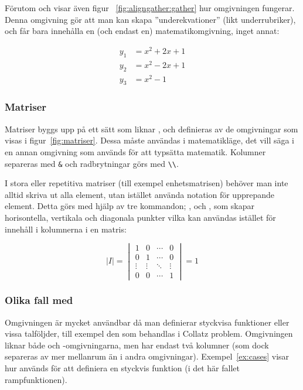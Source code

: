\documentclass[../../a4.tex]{subfiles}
\begin{document}
\clearpage
{}
Förutom  och  visar även figur~%
\vref{fig:aligngather:gather} hur omgivningen  fungerar. Denna
omgivning gör att man kan skapa ”underekvationer” (likt underrubriker),
och får bara innehålla en (och endast en) matematikomgivning, inget annat:
\begin{latexcode}
\begin{subequations}
\begin{align}
y_1 &= x^2 + 2x + 1 \\
y_2 &= x^2 - 2x + 1 \\
y_3 &= x^2 - 1
\end{align}
\end{subequations}
\end{latexcode}

\subsubsection{Matriser}
Matriser byggs upp på ett sätt som liknar , och definieras
av de omgivningar som visas i figur~\vref{fig:matriser}. Dessa måste
användas i matematikläge, det vill säga i en annan omgivning som används
för att typsätta matematik. Kolumner separeras med \verb|&| och
radbrytningar görs med \verb|\\|.

I stora eller repetitiva matriser (till exempel enhetsmatrisen) behöver
man inte alltid skriva ut alla element, utan istället använda notation
för upprepande element. Detta görs med hjälp av tre kommandon; 
	,  och , som skapar horisontella,
	vertikala och diagonala punkter vilka kan användas istället för innehåll
i kolumnerna i en matris:\label{sec:3:matrispktr}
\begin{latexcode}
\begin{equation*}
\lvert I\rvert = \begin{vmatrix}
1      & 0      & \cdots & 0      \\
0      & 1      & \cdots & 0      \\ 
\vdots & \vdots & \ddots & \vdots \\
0      & 0      & \cdots & 1
\end{vmatrix} = 1
\end{equation*}
\end{latexcode}

\subsubsection{Olika fall med }
Omgivningen  är mycket användbar då man definierar styckvisa
funktioner eller vissa talföljder, till exempel den som behandlas i 
Collatz problem.
Omgivningen liknar både  och -omgivningarna, men
har endast två kolumner (som dock separeras av mer mellanrum än i andra
omgivningar). Exempel~\vref{ex:cases} visar hur  används för
att definiera en styckvis funktion (i det här fallet rampfunktionen).
\end{document}
